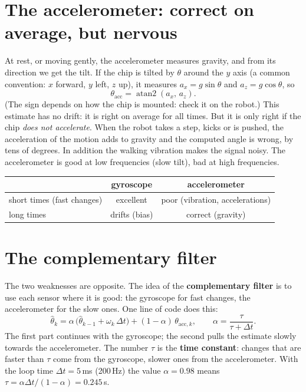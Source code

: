 \section*{The accelerometer: correct on average, but nervous}
At rest, or moving gently, the accelerometer measures gravity, and from its direction we get the tilt. If the chip is tilted by $\theta$ around the $y$ axis (a common convention: $x$ forward, $y$ left, $z$ up), it measures $a_x=g\sin\theta$ and $a_z=g\cos\theta$, so
\[
\theta_{\text{acc}}=\operatorname{atan2}(a_x,\,a_z).
\]
(The sign depends on how the chip is mounted: check it on the robot.) This estimate has no drift: it is right on average for all times. But it is only right if the chip \emph{does not accelerate}. When the robot takes a step, kicks or is pushed, the acceleration of the motion adds to gravity and the computed angle is wrong, by tens of degrees. In addition the walking vibration makes the signal noisy. The accelerometer is good at low frequencies (slow tilt), bad at high frequencies.

\begin{center}
\begin{tabular}{l c c}
\hline
 & gyroscope & accelerometer\\\hline
short times (fast changes) & excellent & poor (vibration, accelerations)\\
long times & drifts (bias) & correct (gravity)\\\hline
\end{tabular}
\end{center}

\section*{The complementary filter}
The two weaknesses are opposite. The idea of the \textbf{complementary filter} is to use each sensor where it is good: the gyroscope for fast changes, the accelerometer for the slow ones. One line of code does this:
\[
\hat\theta_k=\alpha\,\bigl(\hat\theta_{k-1}+\omega_k\,\Delta t\bigr)+(1-\alpha)\,\theta_{\text{acc},k},\qquad \alpha=\frac{\tau}{\tau+\Delta t}.
\]
The first part continues with the gyroscope; the second pulls the estimate slowly towards the accelerometer. The number $\tau$ is the \textbf{time constant}: changes that are faster than $\tau$ come from the gyroscope, slower ones from the accelerometer. With the loop time $\Delta t=5$\,ms (200\,Hz) the value $\alpha=0.98$ means $\tau=\alpha\Delta t/(1-\alpha)=0.245$\,s.

